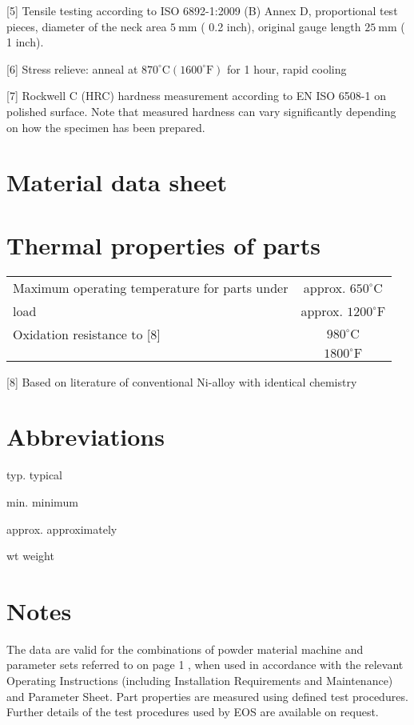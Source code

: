 \documentclass[10pt]{article}
\begin{document}
[5] Tensile testing according to ISO 6892-1:2009 (B) Annex D, proportional test pieces, diameter of the neck area $5 \mathrm{~mm}$ ( 0.2 inch), original gauge length $25 \mathrm{~mm}$ ( 1 inch).

[6] Stress relieve: anneal at $870^{\circ} \mathrm{C}\left(1600^{\circ} \mathrm{F}\right)$ for 1 hour, rapid cooling

[7] Rockwell C (HRC) hardness measurement according to EN ISO 6508-1 on polished surface. Note that measured hardness can vary significantly depending on how the specimen has been prepared.

\section*{Material data sheet}
\section*{Thermal properties of parts}
\begin{center}
\begin{tabular}{lc}
\hline
Maximum operating temperature for parts under & approx. $650^{\circ} \mathrm{C}$ \\
load & approx. $1200^{\circ} \mathrm{F}$ \\
\hline
Oxidation resistance to [8] & $980^{\circ} \mathrm{C}$ \\
 & $1800^{\circ} \mathrm{F}$ \\
\hline
\end{tabular}
\end{center}

[8] Based on literature of conventional Ni-alloy with identical chemistry

\section*{Abbreviations}
typ. typical

min. minimum

approx. approximately

wt weight

\section*{Notes}
The data are valid for the combinations of powder material machine and parameter sets referred to on page 1 , when used in accordance with the relevant Operating Instructions (including Installation Requirements and Maintenance) and Parameter Sheet. Part properties are measured using defined test procedures. Further details of the test procedures used by EOS are available on request.
\end{document}
